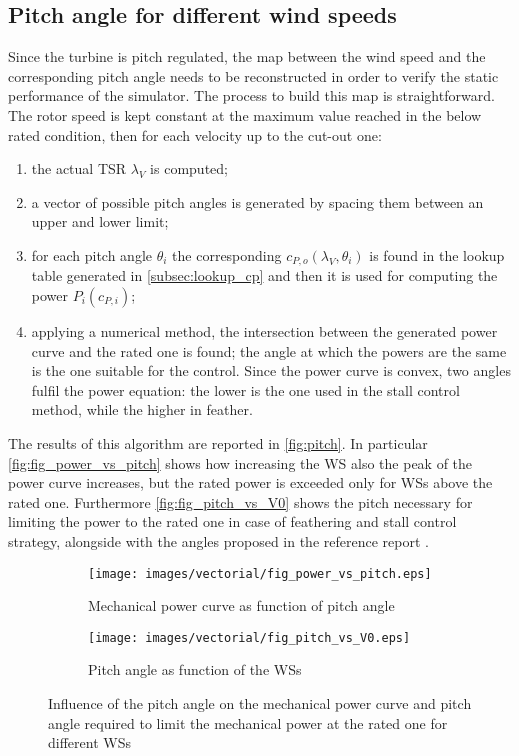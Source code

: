 \subsection{Pitch angle for different wind speeds}\label{subsec:pitch_map}
Since the turbine is pitch regulated, the map between the wind speed and the corresponding pitch angle needs to be reconstructed in order to verify the static performance of the simulator. The process to build this map is straightforward. The rotor speed is kept constant at the maximum value reached in the below rated condition, then for each velocity up to the cut-out one:
\begin{enumerate}
    \item  the actual \acrshort{TSR} $\lambda_V$ is computed;
    \item a vector of possible pitch angles is generated by spacing them between an upper and lower limit;
    \item for each pitch angle $\theta_i$ the corresponding $c_{P,o}(\lambda_V, \theta_i)$ is found in the lookup table generated in \autoref{subsec:lookup_cp} and then it is used for computing the power $P_i(c_{P,i})$;
    \item applying a numerical method, the intersection between the generated power curve and the rated one is found; the angle at which the powers are the same is the one suitable for the control. Since the power curve is convex, two angles fulfil the power equation: the lower is the one used in the stall control method, while the higher in feather.
\end{enumerate}
The results of this algorithm are reported in \autoref{fig:pitch}. In particular \autoref{fig:fig_power_vs_pitch} shows how increasing the \acrshort{WS} also the peak of the power curve increases, but the rated power is exceeded only for \acrshort{WSs} above the rated one. Furthermore \autoref{fig:fig_pitch_vs_V0} shows the pitch necessary for limiting the power to the rated one in case of feathering and stall control strategy, alongside with the angles proposed in the reference report \cite{DTU_Wind_Energy_Report-I-0092}. 
\begin{figure}[htb]
    \centering
    \begin{subfigure}{0.49\textwidth}
    \centering
    \texttt{[image: images/vectorial/fig\_power\_vs\_pitch.eps]}
    \caption{Mechanical power curve as function of pitch angle}
    \label{fig:fig_power_vs_pitch}
    \end{subfigure}
    \begin{subfigure}{0.49\textwidth}
    \texttt{[image: images/vectorial/fig\_pitch\_vs\_V0.eps]}
    \caption{Pitch angle as function of the \acrshort{WSs}}
    \label{fig:fig_pitch_vs_V0}
    \end{subfigure}
    \caption{Influence of the pitch angle on the mechanical power curve and pitch angle required to limit the mechanical power at the rated one for different \acrshort{WSs}}
    \label{fig:pitch}
\end{figure}


